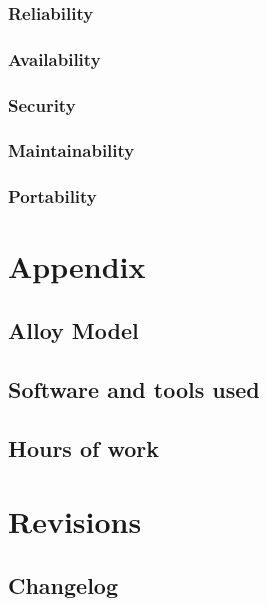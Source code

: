 \documentclass[english]{article}
\begin{document}
\subsubsection{Reliability}

\subsubsection{Availability}

\subsubsection{Security}

\subsubsection{Maintainability}

\subsubsection{Portability}

\newpage{}

\section{Appendix}

\subsection{Alloy Model}

\subsection{Software and tools used}

\subsection{Hours of work}

\newpage{}

\section{Revisions}

\subsection{Changelog}
\end{document}
